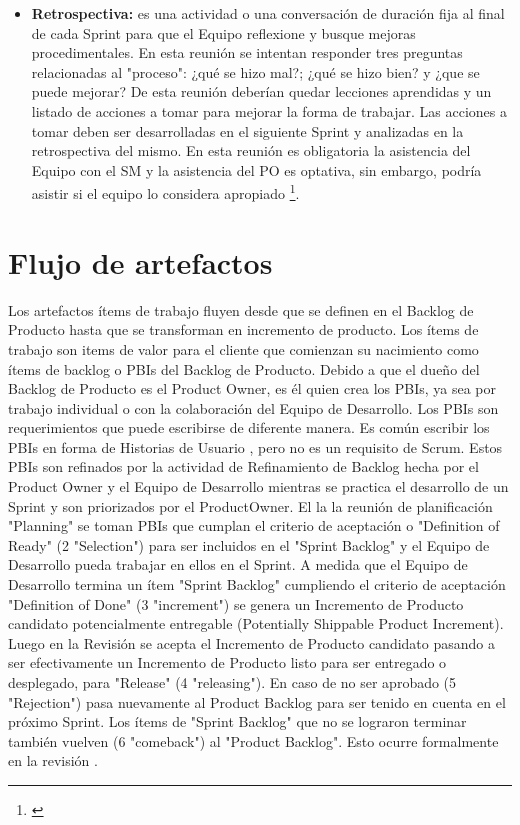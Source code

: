\begin{itemize}
\item \textbf{Retrospectiva:} es una actividad o una conversación de duración fija al final de cada Sprint para que el Equipo reflexione y busque mejoras procedimentales. En esta reunión se intentan responder tres preguntas relacionadas al "proceso": ¿qué se hizo mal?; ¿qué se hizo bien? y ¿que se puede mejorar?
De esta reunión deberían quedar lecciones aprendidas y un listado de acciones a tomar para mejorar la forma de trabajar. Las acciones a tomar deben ser desarrolladas en el siguiente Sprint y analizadas en la retrospectiva del mismo.
En esta reunión es obligatoria la asistencia del Equipo con el SM y la asistencia del PO es optativa, sin embargo, podría asistir si el equipo lo considera apropiado \footnote{\cite{Martin-Alaimo-2014}}.

\end{itemize}

\section{Flujo de artefactos}

Los artefactos ítems de trabajo fluyen desde que se definen en el Backlog de Producto hasta que se transforman en incremento de producto. Los ítems de trabajo son items de valor para el cliente que comienzan su nacimiento como ítems de backlog o PBIs del Backlog de Producto. Debido a que el dueño del Backlog de Producto es el Product Owner, es él quien crea los PBIs, ya sea por trabajo individual o con la colaboración del Equipo de Desarrollo. Los PBIs son requerimientos que puede escribirse de diferente manera. Es común escribir los PBIs en forma de Historias de Usuario \cite{Cohn-2004}, pero no es un requisito de Scrum. Estos PBIs son refinados por la actividad de Refinamiento de Backlog hecha por el Product Owner y el Equipo de Desarrollo mientras se practica el desarrollo de un Sprint y son priorizados por el ProductOwner. El la la reunión de planificación "Planning" se toman PBIs que cumplan el criterio de aceptación o "Definition of Ready" (2 "Selection") para ser incluidos en el "Sprint Backlog" y el Equipo de Desarrollo pueda trabajar en ellos en el Sprint. A medida que el Equipo de Desarrollo termina un ítem "Sprint Backlog" cumpliendo el criterio de aceptación "Definition of Done" (3 "increment") se genera un Incremento de Producto candidato potencialmente entregable (Potentially Shippable Product Increment). Luego en la Revisión se acepta el Incremento de Producto candidato pasando a ser efectivamente un Incremento de Producto listo para ser entregado o desplegado, para "Release" (4 "releasing"). En caso de no ser aprobado (5 "Rejection") pasa nuevamente al Product Backlog para ser tenido en cuenta en el próximo Sprint. Los ítems de "Sprint Backlog" que no se lograron terminar también vuelven (6 "comeback") al "Product Backlog". Esto ocurre formalmente en la revisión \cite{Martin-Alaimo-2014}.

